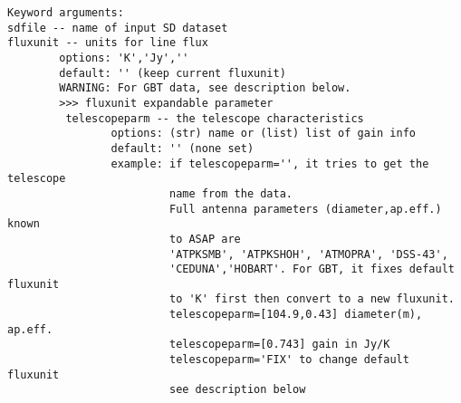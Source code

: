 \begin{verbatim}
Keyword arguments:
sdfile -- name of input SD dataset
fluxunit -- units for line flux
        options: 'K','Jy',''
        default: '' (keep current fluxunit)
        WARNING: For GBT data, see description below.
        >>> fluxunit expandable parameter
         telescopeparm -- the telescope characteristics
                options: (str) name or (list) list of gain info
                default: '' (none set)
                example: if telescopeparm='', it tries to get the telescope
                         name from the data.
                         Full antenna parameters (diameter,ap.eff.) known
                         to ASAP are
                         'ATPKSMB', 'ATPKSHOH', 'ATMOPRA', 'DSS-43',
                         'CEDUNA','HOBART'. For GBT, it fixes default fluxunit
                         to 'K' first then convert to a new fluxunit.
                         telescopeparm=[104.9,0.43] diameter(m), ap.eff.
                         telescopeparm=[0.743] gain in Jy/K
                         telescopeparm='FIX' to change default fluxunit
                         see description below


\end{verbatim}
